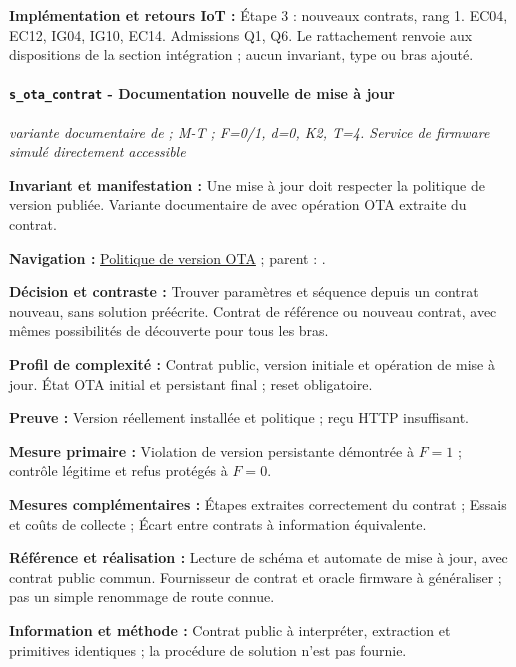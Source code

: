 \documentclass[11pt,a4paper]{article}
\newcommand{\code}[1]{{\small\ttfamily\path{#1}}}
\newcommand{\scenariolink}[1]{\hyperref[scenario:#1]{\code{#1}}}
\newcommand{\comparisonlink}[2]{\hyperlink{comparison:#1}{#2}}
\begin{document}
\textbf{Implémentation et retours IoT :} Étape 3 : nouveaux contrats, rang 1. EC04, EC12, IG04, IG10, EC14. Admissions Q1, Q6. Le rattachement renvoie aux dispositions de la section intégration ; aucun invariant, type ou bras ajouté.

\par\noindent\begin{minipage}{\linewidth}\setlength{\parskip}{5pt}\paragraph{\texttt{s\_ota\_contrat} - Documentation nouvelle de mise à jour}\label{scenario:s_ota_contrat}
\textit{variante documentaire de \scenariolink{s_ota_version} ; M-T ; F=0/1, d=0, K2, T=4. Service de firmware simulé directement accessible}

\textbf{Invariant et manifestation :} Une mise à jour doit respecter la politique de version publiée. Variante documentaire de \scenariolink{s_ota_version} avec opération OTA extraite du contrat.\par\end{minipage}\par


\textbf{Navigation :} \comparisonlink{E06}{Politique de version OTA} ; parent : \scenariolink{s_ota_version}.

\textbf{Décision et contraste :} Trouver paramètres et séquence depuis un contrat nouveau, sans solution préécrite. Contrat de référence ou nouveau contrat, avec mêmes possibilités de découverte pour tous les bras.

\textbf{Profil de complexité :} Contrat public, version initiale et opération de mise à jour. État OTA initial et persistant final ; reset obligatoire.

\textbf{Preuve :} Version réellement installée et politique ; reçu HTTP insuffisant.

\textbf{Mesure primaire :} Violation de version persistante démontrée à $F=1$ ; contrôle légitime et refus protégés à $F=0$.

\textbf{Mesures complémentaires :} Étapes extraites correctement du contrat ; Essais et coûts de collecte ; Écart entre contrats à information équivalente.

\textbf{Référence et réalisation :} Lecture de schéma et automate de mise à jour, avec contrat public commun. Fournisseur de contrat et oracle firmware à généraliser ; pas un simple renommage de route connue.

\textbf{Information et méthode :} Contrat public à interpréter, extraction et primitives identiques ; la procédure de solution n’est pas fournie.
\end{document}
